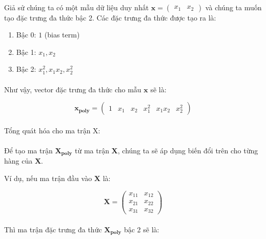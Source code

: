 \paragraph{}{Giả sử chúng ta có một mẫu dữ liệu duy nhất $\mathbf{x} = \begin{pmatrix} x_1 & x_2 \end{pmatrix}$ và chúng ta muốn tạo đặc trưng đa thức bậc 2. Các đặc trưng đa thức được tạo ra là:}

\begin{enumerate}
    \item Bậc 0: $1$ (bias term)
    \item Bậc 1: $x_1, x_2$
    \item Bậc 2: $x_1^2, x_1x_2, x_2^2$
\end{enumerate}

\paragraph{}{Như vậy, vector đặc trưng đa thức cho mẫu $\mathbf{x}$ sẽ là:}

$$
\mathbf{x_{poly}} = \begin{pmatrix} 1 & x_1 & x_2 & x_1^2 & x_1x_2 & x_2^2 \end{pmatrix}
$$

\paragraph{}{Tổng quát hóa cho ma trận X:}

\paragraph{}{Để tạo ma trận $\mathbf{X_{poly}}$ từ ma trận $\mathbf{X}$, chúng ta sẽ áp dụng biến đổi trên cho từng hàng của $\mathbf{X}$.\newline

Ví dụ, nếu ma trận đầu vào $\mathbf{X}$ là:}

$$
\mathbf{X} =
\begin{pmatrix}
  x_{11} & x_{12} \\
  x_{21} & x_{22} \\
  x_{31} & x_{32}
\end{pmatrix}
$$

\paragraph{}{Thì ma trận đặc trưng đa thức $\mathbf{X_{poly}}$ bậc 2 sẽ là:}

